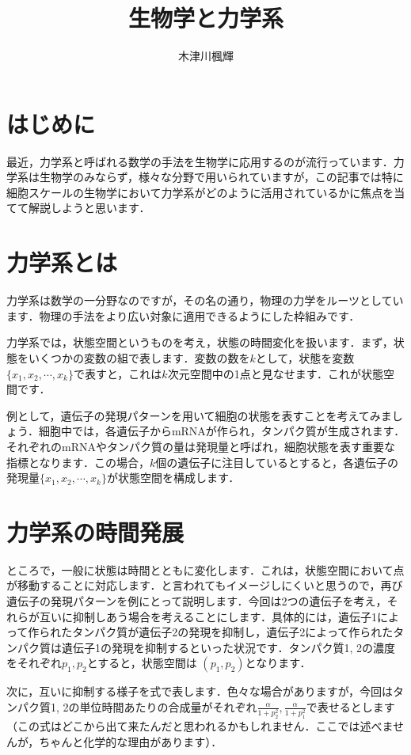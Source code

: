 \documentclass[platex,dvipdfmx, a5paper]{jlreq}			%
\title{生物学と力学系}
\author{木津川楓輝}
\date{}
\begin{document}
\maketitle
\thispagestyle{empty}
\section{はじめに}
最近，力学系と呼ばれる数学の手法を生物学に応用するのが流行っています．力学系は生物学のみならず，様々な分野で用いられていますが，この記事では特に細胞スケールの生物学において力学系がどのように活用されているかに焦点を当てて解説しようと思います．
\section{力学系とは}
力学系は数学の一分野なのですが，その名の通り，物理の力学をルーツとしています．物理の手法をより広い対象に適用できるようにした枠組みです．

力学系では，状態空間というものを考え，状態の時間変化を扱います．まず，状態をいくつかの変数の組で表します．変数の数を$k$として，状態を変数$\{x_1, x_2, \cdots, x_k\}$で表すと，これは$k$次元空間中の1点と見なせます．これが状態空間です．

例として，遺伝子の発現パターンを用いて細胞の状態を表すことを考えてみましょう．細胞中では，各遺伝子からmRNAが作られ，タンパク質が生成されます．それぞれのmRNAやタンパク質の量は発現量と呼ばれ，細胞状態を表す重要な指標となります．この場合，$k$個の遺伝子に注目しているとすると，各遺伝子の発現量$\{x_1, x_2, \cdots, x_k\}$が状態空間を構成します．
\section{力学系の時間発展}
ところで，一般に状態は時間とともに変化します．これは，状態空間において点が移動することに対応します．と言われてもイメージしにくいと思うので，再び遺伝子の発現パターンを例にとって説明します．今回は2つの遺伝子を考え，それらが互いに抑制しあう場合を考えることにします．具体的には，遺伝子1によって作られたタンパク質が遺伝子2の発現を抑制し，遺伝子2によって作られたタンパク質は遺伝子1の発現を抑制するといった状況です．タンパク質1, 2の濃度をそれぞれ$p_1, p_2$とすると，状態空間は $(p_1, p_2)$となります．

次に，互いに抑制する様子を式で表します．色々な場合がありますが，今回はタンパク質1, 2の単位時間あたりの合成量がそれぞれ$\frac{\alpha}{1 + p_2^2}, \frac{\alpha}{1 + p_1^2}$で表せるとします（この式はどこから出て来たんだと思われるかもしれません．ここでは述べませんが，ちゃんと化学的な理由があります）．
\end{document}
